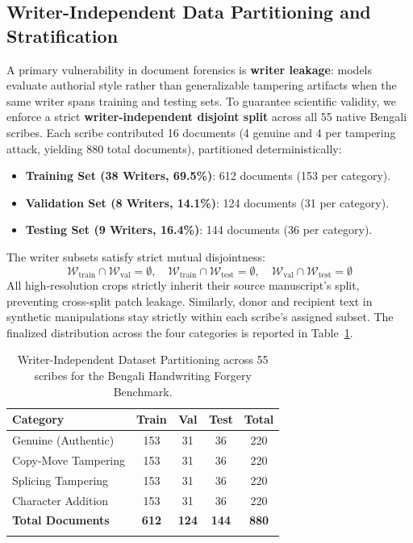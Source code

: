 \documentclass[pdflatex,sn-mathphys-num,iicol]{sn-jnl}
\begin{document}
\subsection{Writer-Independent Data Partitioning and Stratification}\label{subsec3_4}
A primary vulnerability in document forensics is \textbf{writer leakage}: models evaluate authorial style rather than generalizable tampering artifacts when the same writer spans training and testing sets. To guarantee scientific validity, we enforce a strict \textbf{writer-independent disjoint split} across all 55 native Bengali scribes. Each scribe contributed 16 documents (4 genuine and 4 per tampering attack, yielding 880 total documents), partitioned deterministically:
\begin{itemize}
    \item \textbf{Training Set (38 Writers, 69.5\%)}: 612 documents (153 per category).
    \item \textbf{Validation Set (8 Writers, 14.1\%)}: 124 documents (31 per category).
    \item \textbf{Testing Set (9 Writers, 16.4\%)}: 144 documents (36 per category).
\end{itemize}
The writer subsets satisfy strict mutual disjointness:
\begin{equation}
\mathcal{W}_{\text{train}} \cap \mathcal{W}_{\text{val}} = \emptyset, \quad \mathcal{W}_{\text{train}} \cap \mathcal{W}_{\text{test}} = \emptyset, \quad \mathcal{W}_{\text{val}} \cap \mathcal{W}_{\text{test}} = \emptyset
\end{equation}
All high-resolution crops strictly inherit their source manuscript's split, preventing cross-split patch leakage. Similarly, donor and recipient text in synthetic manipulations stay strictly within each scribe's assigned subset. The finalized distribution across the four categories is reported in Table~\ref{tab:dataset_split}.

\begin{table}[ht]
\caption{Writer-Independent Dataset Partitioning across 55 scribes for the Bengali Handwriting Forgery Benchmark.}\label{tab:dataset_split}
\setlength{\tabcolsep}{2.5pt}
\begin{tabular*}{\columnwidth}{@{\extracolsep\fill}lcccc@{}}
\toprule
\textbf{Category} & \textbf{Train} & \textbf{Val} & \textbf{Test} & \textbf{Total} \\
\midrule
Genuine (Authentic)    & 153 & 31 & 36 & 220 \\
Copy-Move Tampering    & 153 & 31 & 36 & 220 \\
Splicing Tampering     & 153 & 31 & 36 & 220 \\
Character Addition     & 153 & 31 & 36 & 220 \\
\midrule
\textbf{Total Documents} & \textbf{612} & \textbf{124} & \textbf{144} & \textbf{880} \\
\botrule
\end{tabular*}
\end{table}
\end{document}
